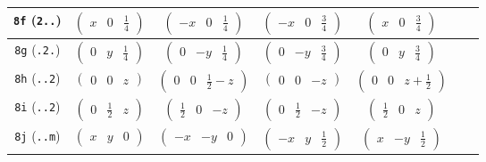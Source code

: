 \documentclass[fleqn,9pt,landscape]{jsarticle}
\begin{document}
\begin{center}
\begin{longtable}{ccccccc}
{\tt 8f} ({\tt 2..}) & $ \begin{pmatrix} x & 0 & \frac{1}{4} \end{pmatrix} $ & $ \begin{pmatrix} - x & 0 & \frac{1}{4} \end{pmatrix} $ & $ \begin{pmatrix} - x & 0 & \frac{3}{4} \end{pmatrix} $ & $ \begin{pmatrix} x & 0 & \frac{3}{4} \end{pmatrix} $ & $  $ & $  $ \\ \hline
{\tt 8g} ({\tt .2.}) & $ \begin{pmatrix} 0 & y & \frac{1}{4} \end{pmatrix} $ & $ \begin{pmatrix} 0 & - y & \frac{1}{4} \end{pmatrix} $ & $ \begin{pmatrix} 0 & - y & \frac{3}{4} \end{pmatrix} $ & $ \begin{pmatrix} 0 & y & \frac{3}{4} \end{pmatrix} $ & $  $ & $  $ \\ \hline
{\tt 8h} ({\tt ..2}) & $ \begin{pmatrix} 0 & 0 & z \end{pmatrix} $ & $ \begin{pmatrix} 0 & 0 & \frac{1}{2} - z \end{pmatrix} $ & $ \begin{pmatrix} 0 & 0 & - z \end{pmatrix} $ & $ \begin{pmatrix} 0 & 0 & z + \frac{1}{2} \end{pmatrix} $ & $  $ & $  $ \\ \hline
{\tt 8i} ({\tt ..2}) & $ \begin{pmatrix} 0 & \frac{1}{2} & z \end{pmatrix} $ & $ \begin{pmatrix} \frac{1}{2} & 0 & - z \end{pmatrix} $ & $ \begin{pmatrix} 0 & \frac{1}{2} & - z \end{pmatrix} $ & $ \begin{pmatrix} \frac{1}{2} & 0 & z \end{pmatrix} $ & $  $ & $  $ \\ \hline
{\tt 8j} ({\tt ..m}) & $ \begin{pmatrix} x & y & 0 \end{pmatrix} $ & $ \begin{pmatrix} - x & - y & 0 \end{pmatrix} $ & $ \begin{pmatrix} - x & y & \frac{1}{2} \end{pmatrix} $ & $ \begin{pmatrix} x & - y & \frac{1}{2} \end{pmatrix} $ & $  $ & $  $ \\ \hline

\end{longtable}
\end{center}
\end{document}
